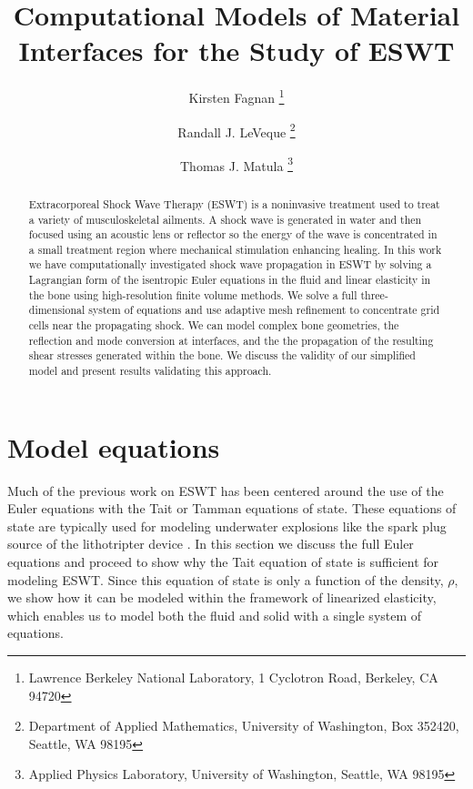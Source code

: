 \documentclass{article}
\title{Computational Models of Material Interfaces for the Study of ESWT}
\author{Kirsten Fagnan \thanks{Lawrence Berkeley National Laboratory, 1 Cyclotron Road, Berkeley, 
CA 94720} \and Randall J. LeVeque \thanks{Department of Applied Mathematics, University of 
Washington, Box 352420, Seattle, WA 98195} \and Thomas J. Matula \thanks{Applied Physics 
Laboratory, University of Washington, Seattle, WA 98195}}
\begin{document}
\maketitle

\begin{abstract}
Extracorporeal Shock Wave Therapy (ESWT) is a noninvasive treatment
used to treat a variety of musculoskeletal ailments.
A shock wave is generated in water
and then focused using an acoustic lens or reflector so the energy of
the wave is concentrated in a small treatment region where mechanical stimulation
enhancing healing.
In this work we have computationally
investigated shock wave propagation in ESWT by solving a Lagrangian
form of the isentropic Euler equations in the fluid and linear
elasticity in the bone using high-resolution finite volume methods.
We solve a full three-dimensional system of equations and use adaptive mesh
refinement to concentrate grid cells near the propagating shock.  
We can model complex bone
geometries, the reflection and mode conversion at interfaces, and the
the propagation of the resulting
shear stresses generated within the bone.   We discuss the validity of our
simplified model and present results validating this approach. 
\end{abstract}

\pagestyle{myheadings}
\thispagestyle{plain}



\section{Model equations}
\label{sec:model_equations}
Much of the previous work on ESWT has been centered around the use of the Euler equations with the 
Tait or Tamman equations of state.  These equations of state are typically used for modeling underwater 
explosions like the spark plug source of the lithotripter device \cite{hamilton,toro_ivings}.  In this section 
we discuss the full Euler equations and proceed to show why the Tait equation of state is sufficient for 
modeling ESWT.  Since this equation of state is only a function of the density, $\rho$, we show how it 
can be modeled within the framework of linearized elasticity, which enables us to model both the fluid 
and solid with a single system of equations. 
\end{document}
